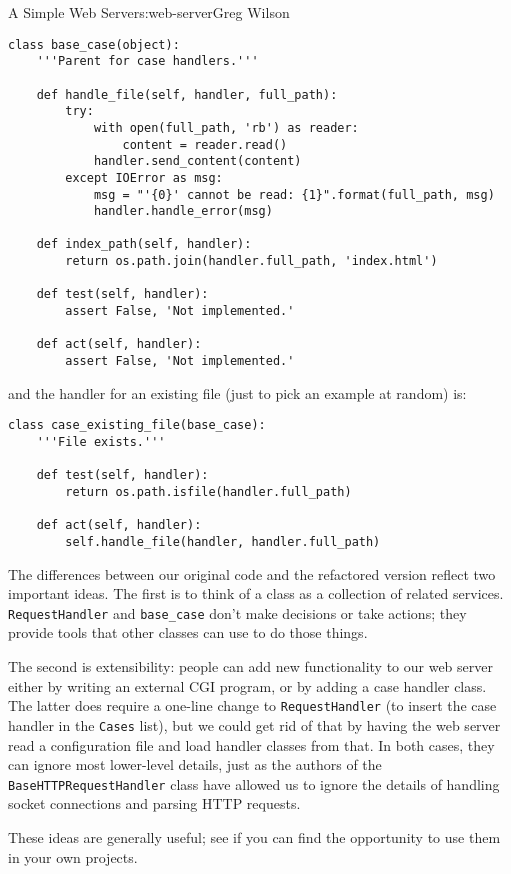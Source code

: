 \begin{aosachapter}{A Simple Web Server}{s:web-server}{Greg Wilson}
\begin{verbatim}
class base_case(object):
    '''Parent for case handlers.'''

    def handle_file(self, handler, full_path):
        try:
            with open(full_path, 'rb') as reader:
                content = reader.read()
            handler.send_content(content)
        except IOError as msg:
            msg = "'{0}' cannot be read: {1}".format(full_path, msg)
            handler.handle_error(msg)

    def index_path(self, handler):
        return os.path.join(handler.full_path, 'index.html')

    def test(self, handler):
        assert False, 'Not implemented.'

    def act(self, handler):
        assert False, 'Not implemented.'
\end{verbatim}

and the handler for an existing file (just to pick an example at random)
is:

\begin{verbatim}
class case_existing_file(base_case):
    '''File exists.'''

    def test(self, handler):
        return os.path.isfile(handler.full_path)

    def act(self, handler):
        self.handle_file(handler, handler.full_path)
\end{verbatim}

\label{discussion}

The differences between our original code and the refactored version
reflect two important ideas. The first is to think of a class as a
collection of related services. \texttt{RequestHandler} and
\texttt{base\_case} don't make decisions or take actions; they provide
tools that other classes can use to do those things.

The second is extensibility: people can add new functionality to our web
server either by writing an external CGI program, or by adding a case
handler class. The latter does require a one-line change to
\texttt{RequestHandler} (to insert the case handler in the
\texttt{Cases} list), but we could get rid of that by having the web
server read a configuration file and load handler classes from that. In
both cases, they can ignore most lower-level details, just as the
authors of the \texttt{BaseHTTPRequestHandler} class have allowed us to
ignore the details of handling socket connections and parsing HTTP
requests.

These ideas are generally useful; see if you can find the opportunity to
use them in your own projects.

\end{aosachapter}

